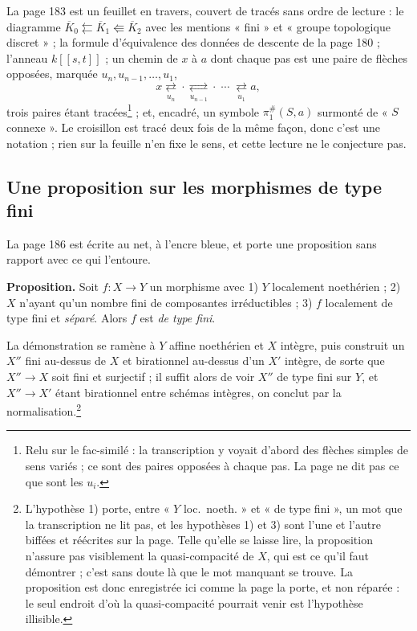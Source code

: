 \documentclass[11pt,a4paper]{article}
\begin{document}
La page 183 est un feuillet en travers, couvert de tracés sans ordre de
lecture : le diagramme $\overline{K}_{0} \leftleftarrows \overline{K}_{1}
\Lleftarrow \overline{K}_{2}$ avec les mentions « fini » et « groupe
topologique discret » ; la formule d'équivalence des données de descente de la
page 180 ; l'anneau $k[[s,t]]$ ; un chemin de $x$ à $a$ dont chaque pas est une
paire de flèches opposées, marquée $u_{n}, u_{n-1}, \ldots, u_{1}$,
\[
  x \underset{u_{n}}{\rightleftarrows} \cdot
  \underset{u_{n-1}}{\rightleftarrows} \cdot \; \cdots \;
  \underset{u_{1}}{\rightleftarrows} a ,
\]
trois paires étant tracées\footnote{Relu sur le fac-similé : la transcription
y voyait d'abord des flèches simples de sens variés ; ce sont des paires
opposées à chaque pas. La page ne dit pas ce que sont les $u_{i}$.} ; et, encadré, un symbole
$\pi_{1}^{\#}(S,a)$ surmonté de « $S$ connexe ». Le croisillon est tracé deux
fois de la même façon, donc c'est une notation ; rien sur la feuille n'en fixe
le sens, et cette lecture ne le conjecture pas.

\subsection*{Une proposition sur les morphismes de type fini}

La page 186 est écrite au net, à l'encre bleue, et porte une proposition sans
rapport avec ce qui l'entoure.

\textbf{Proposition.} Soit $f : X \to Y$ un morphisme avec 1) $Y$ localement
noethérien ; 2) $X$ n'ayant qu'un nombre fini de composantes irréductibles ;
3) $f$ localement de type fini et \emph{séparé}. Alors $f$ est \emph{de type
fini}.

La démonstration se ramène à $Y$ affine noethérien et $X$ intègre, puis
construit un $X''$ fini au-dessus de $X$ et birationnel au-dessus d'un $X'$
intègre, de sorte que $X'' \to X$ soit fini et surjectif ; il suffit alors de
voir $X''$ de type fini sur $Y$, et $X'' \to X'$ étant birationnel entre
schémas intègres, on conclut par la normalisation.\footnote{L'hypothèse 1)
porte, entre « $Y$ loc.\ noeth. » et « de type fini », un mot que la
transcription ne lit pas, et les hypothèses 1) et 3) sont l'une et l'autre
biffées et réécrites sur la page. Telle qu'elle se laisse lire, la proposition
n'assure pas visiblement la quasi-compacité de $X$, qui est ce qu'il faut
démontrer ; c'est sans doute là que le mot manquant se trouve. La proposition
est donc enregistrée ici comme la page la porte, et non réparée : le seul
endroit d'où la quasi-compacité pourrait venir est l'hypothèse illisible.}
\end{document}
